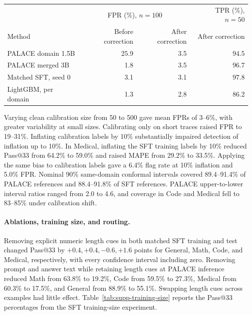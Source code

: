 \documentclass[11pt]{article}
\begin{document}
\begin{center}
\begin{minipage}{\linewidth}
\centering
{}\label{tab:supp-workload-shift}
\small
\begin{tabular}{lrrr}
\toprule
& \multicolumn{2}{c}{FPR (\%), \(n=100\)} & TPR (\%), \(n=50\)\\
Method & Before correction & After correction & After correction\\
\midrule
PALACE domain 1.5B &25.9&3.5&94.5\\
PALACE merged 3B &1.8&3.5&96.7\\
Matched SFT, seed 0 &3.1&3.1&97.8\\
LightGBM, per domain &1.3&2.8&86.2\\
\bottomrule
\end{tabular}
\end{minipage}
\end{center}

Varying clean calibration size from 50 to 500 gave mean FPRs of 3--6\%, with greater variability at small sizes. Calibrating only on short traces raised FPR to 19--31\%. Inflating calibration labels by 10\% substantially impaired detection of inflation up to 10\%. In Medical, inflating the SFT training labels by 10\% reduced Pass@33 from 64.2\% to 59.0\% and raised MAPE from 29.2\% to 33.5\%. Applying the same bias to calibration labels gave a 6.4\% flag rate at 10\% inflation and 5.0\% FPR. Nominal 90\% same-domain conformal intervals covered 89.4--91.4\% of PALACE references and 88.4--91.8\% of SFT references. PALACE upper-to-lower interval ratios ranged from 2.0 to 4.6, and coverage in Code and Medical fell to 83--85\% under calibration shift.

\paragraph{Ablations, training size, and routing.}
Removing explicit numeric length cues in both matched SFT training and test changed Pass@33 by \(+0.4,+0.4,-0.6,+1.6\) points for General, Math, Code, and Medical, respectively, with every confidence interval including zero. Removing prompt and answer text while retaining length cues at PALACE inference reduced Math from 63.8\% to 19.2\%, Code from 59.5\% to 27.3\%, Medical from 60.3\% to 17.5\%, and General from 88.9\% to 55.1\%. Swapping length cues across examples had little effect. Table~\ref{tab:supp-training-size} reports the Pass@33 percentages from the SFT training-size experiment.
\end{document}
